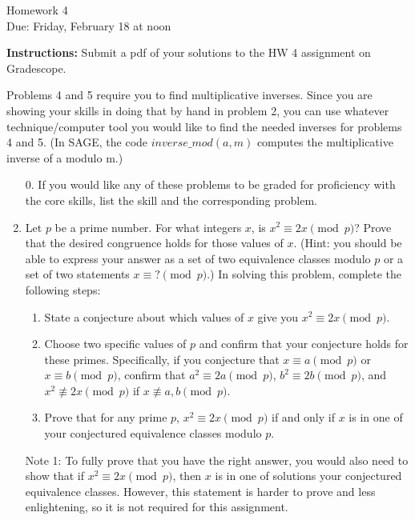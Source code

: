\documentclass[12pt]{article}
\begin{document}
\begin{center}
{\Large Homework 4}\\
Due: Friday,  February 18 at noon\\


\end{center}
{\bf Instructions:} Submit a pdf of your solutions to the HW 4 assignment on Gradescope. 


 Problems 4 and 5 require you to find multiplicative inverses. Since you are showing your skills in doing that by hand in problem 2, you can use whatever technique/computer tool you would like to find the needed inverses for problems 4 and 5.  (In SAGE, the code $inverse\_mod(a,m)$ computes the multiplicative inverse of a modulo m.)

\begin{enumerate}
\item[0.] If you would like any of these problems to be graded for proficiency with the core skills, list the skill and the corresponding problem. 
\item Let $p$ be a prime number.  For what integers $x$, is $x^2\equiv 2x\pmod{p}$? Prove that the desired congruence holds for those values of $x$.  (Hint: you should be able to express your answer as a set of two equivalence classes modulo $p$ or a set of two statements $x\equiv ?\pmod{p}$.) In solving this problem, complete the following steps:
\begin{enumerate}
\item State a conjecture about which values of $x$ give you $x^2\equiv 2x\pmod{p}$.
\item Choose two specific values of $p$ and confirm that your conjecture holds for these primes.  Specifically, if you conjecture that $x\equiv a\pmod{p}$ or $x\equiv b\pmod{p}$, confirm that $a^2\equiv 2a\pmod{p}$, $b^2\equiv2b\pmod{p}$, and $x^2\not\equiv 2x\pmod{p}$ if $x\not\equiv a,b\pmod{p}$. 
\item Prove that for any prime $p$, $x^2\equiv 2x\pmod{p}$ if and only if $x$ is in one of your conjectured equivalence classes modulo $p$. 
\end{enumerate}

Note 1: To fully prove that you have the right answer, you would also need to show that if $x^2\equiv 2x\pmod{p}$, then $x$ is in one of  solutions your conjectured equivalence classes. However, this statement is harder to prove and less enlightening, so it is not required for this assignment.


\end{enumerate}
\end{document}
